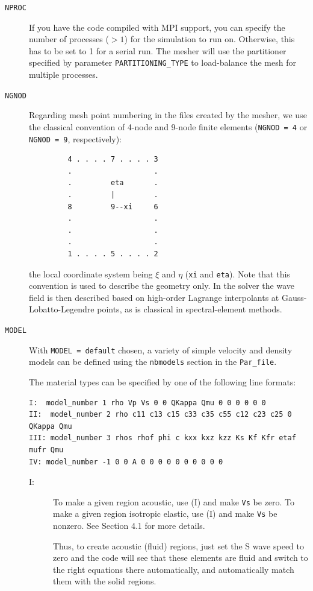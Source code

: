 \begin{description}

\item[{\texttt{NPROC}}]
 If you have the code compiled with MPI support, you can specify the number of processes ($>1$) for the simulation to run on. Otherwise, this has to be set to 1 for a serial run. The mesher will use the partitioner specified by parameter \texttt{PARTITIONING\_TYPE} to load-balance the mesh for multiple processes.

\item[{\texttt{NGNOD}}]
 Regarding mesh point numbering in the files created by the mesher, we use the classical convention of 4-node and 9-node finite elements (\texttt{NGNOD = 4} or \texttt{NGNOD = 9}, respectively):
%
\begin{verbatim}
         4 . . . . 7 . . . . 3
         .                   .
         .         eta       .
         .         |         .
         8         9--xi     6
         .                   .
         .                   .
         .                   .
         1 . . . . 5 . . . . 2
\end{verbatim}
%
the local coordinate system being $\xi$ and $\eta$ (\texttt{xi} and \texttt{eta}).
Note that this convention is used to describe the geometry only. In the solver the wave field is then described based on high-order Lagrange interpolants
at Gauss-Lobatto-Legendre points, as is classical in spectral-element methods.


\item[{\texttt{MODEL}}]
 With \texttt{MODEL = default} chosen, a variety of simple velocity and density models can be defined using the \texttt{nbmodels} section in the \texttt{Par\_file}.

The material types can be specified by one of the following line formats:
%
\begin{verbatim}
I:  model_number 1 rho Vp Vs 0 0 QKappa Qmu 0 0 0 0 0 0
II:  model_number 2 rho c11 c13 c15 c33 c35 c55 c12 c23 c25 0 QKappa Qmu
III: model_number 3 rhos rhof phi c kxx kxz kzz Ks Kf Kfr etaf mufr Qmu
IV: model_number -1 0 0 A 0 0 0 0 0 0 0 0 0 0
\end{verbatim}
%
\begin{description}
\item[I:] To make a given region acoustic, use (I) and make \texttt{Vs} be zero. To make a given region isotropic elastic, use (I) and make \texttt{Vs} be nonzero.  See Section 4.1 for more details.

Thus, to create acoustic (fluid) regions, just set the S wave speed to zero and the code will see that these elements are fluid and switch to the right equations there automatically, and automatically match them with the solid regions.


\end{description}
\end{description}
